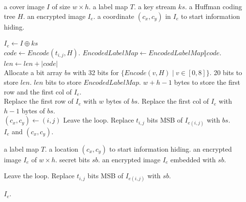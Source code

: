 \begin{algorithm}
	\caption{Generate encrypted image}
	\label{alg:msb:genenc}
	
	\begin{algorithmic}[1]
		\Require a cover image $I$ of size $w \times h$.
		\Require a label map $T$.
		\Require a key stream $ks$.
		\Require a Huffman coding tree $H$.
		\Ensure an encrypted image $I_e$.
		\Ensure a coordinate $(c_x, c_y)$ in $I_e$ to start information hiding.
		
			
			\State $I_e \gets I \oplus ks$
			\\
			\ForAll{$\{t_{i, j} \in T \mid i \in [1, h), j \in [1, w)\}$}
				\State $code \gets Encode(t_{i, j}, H)$.
				\State $EncodedLabelMap \gets EncodedLabelMap \Vert code$.
				\State $len \gets len + \left \vert code \right \vert$
			\EndFor
			\\
			\State Allocate a bit array $bs$ with
				\State\hspace{\algorithmicindent} 32 bits for $\{Encode(v, H) \mid v \in [0, 8] \}$.
				\State\hspace{\algorithmicindent} 20 bits to store $len$.
				\State\hspace{\algorithmicindent} $len$ bits to store $EncodedLabelMap$.
				\State\hspace{\algorithmicindent} $w + h - 1$ bytes to store the first row and the first col of $I_e$.
			\\
			\State Replace the first row of $I_e$ with $w$ bytes of $bs$.
			\State Replace the first col of $I_e$ with $h - 1$ bytes of $bs$.
			\\
			\ForAll{$ i \in [1, h)$ and $ j \in [1, w)$}
					\State $(c_x, c_y) \gets (i, j)$
					\State Leave the loop.
				\Else
					\State Replace $t_{i, j}$ bits MSB of $I_{e(i, j)}$ with $bs$. 
				\EndIf
			\EndFor
			\\
			\State \Return $I_e$ and $(c_x, c_y)$.
		
		\EndFunction
	\end{algorithmic}
\end{algorithm}

\begin{algorithm}
	\caption{Embed secret bits}
	\label{alg:msb:embed}
	
	\begin{algorithmic}[1]
		\Require a label map $T$.
		\Require a location $(c_x, c_y)$ to start information hiding.
		\Require an encrypted image $I_e$ of $w \times h$.
		\Require secret bits $sb$.
		\Ensure an encrypted image $I_e$ embedded with $sb$.
		
			\ForAll{$\{t_{i, j} \in T \mid (i = c_x \wedge j \in [c_y, w)) \vee (i \in (c_x, h), j \in [1, w))\}$}
					\State Leave the loop.
				\Else
					\State Replace $t_{i, j}$ bits MSB of $I_{e(i, j)}$ with $sb$. 
				\EndIf
			\EndFor
		
			\State \Return $I_e$.
		
		\EndFunction
	\end{algorithmic}
\end{algorithm}


